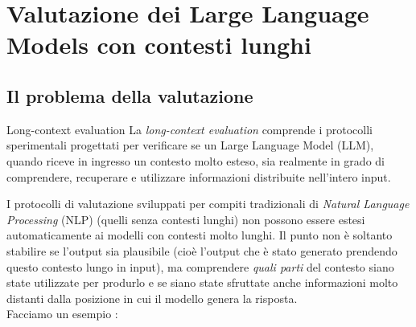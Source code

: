 \section{Valutazione dei Large Language Models con contesti lunghi}

\subsection{Il problema della valutazione}

\begin{definition}{Long-context evaluation}
La \emph{long-context evaluation} comprende i protocolli sperimentali progettati per verificare se un Large Language Model (LLM), quando riceve in ingresso un contesto molto esteso, sia realmente in grado di comprendere, recuperare e utilizzare informazioni distribuite nell'intero input.
\end{definition}

I protocolli di valutazione sviluppati per compiti tradizionali di \emph{Natural Language Processing} (NLP) (quelli senza contesti lunghi) non possono essere estesi automaticamente ai modelli con contesti molto lunghi. Il punto non è soltanto stabilire se l'output sia plausibile (cioè l'output che è stato generato prendendo questo contesto lungo in input), ma comprendere \emph{quali parti} del contesto siano state utilizzate per produrlo
e se siano state sfruttate anche informazioni molto distanti dalla posizione in cui il modello genera la risposta.
\\
Facciamo un esempio :

